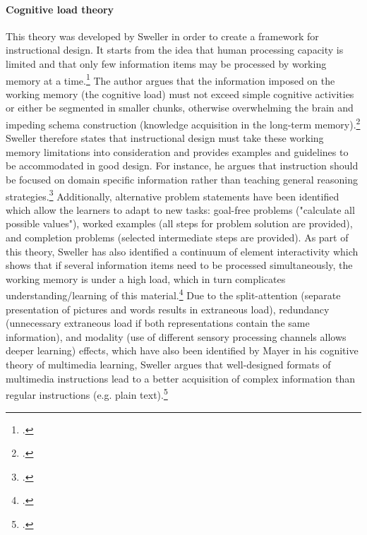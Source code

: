 \paragraph{Cognitive load theory} This theory was developed by Sweller in order to create a framework for instructional design. It starts from the idea that human processing capacity is limited and that only few information items may be processed by working memory at a time.\footcites[Cf.][p.250]{SwellerCognitiveArchitectureInstructional1998}[cf.][p.490]{Gervenefficiencymultimedialearning2003} The author argues that the information imposed on the working memory (the cognitive load) must not exceed simple cognitive activities or either be segmented in smaller chunks, otherwise overwhelming the brain and impeding schema construction (knowledge acquisition in the long-term memory).\footcites[Cf.][pp.255 et seq]{SwellerCognitiveArchitectureInstructional1998}[cf.][p.2]{SwellerVisualisationInstructionalDesign2002}[cf.][p.562]{Gervenefficiencymultimedialearning2003} Sweller therefore states that instructional design must take these working memory limitations into consideration and provides examples and guidelines to be accommodated in good design. For instance, he argues that instruction should be focused on domain specific information rather than teaching general reasoning strategies.\footcites[Cf.][p.255]{SwellerCognitiveArchitectureInstructional1998}[cf.][p.301]{SwellerCognitiveloadtheory1994} Additionally, alternative problem statements have been identified which allow the learners to adapt to new tasks: goal-free problems ("calculate all possible values"), worked examples (all steps for problem solution are provided), and completion problems (selected intermediate steps are provided).
As part of this theory, Sweller has also identified a continuum of element interactivity which shows that if several information items need to be processed simultaneously, the working memory is under a high load, which in turn complicates understanding/learning of this material.\footcites[Cf.][p.261]{SwellerCognitiveArchitectureInstructional1998} Due to the split-attention (separate presentation of pictures and words results in extraneous load), redundancy (unnecessary extraneous load if both representations contain the same information), and modality (use of different sensory processing channels allows deeper learning) effects, which have also been identified by Mayer in his cognitive theory of multimedia learning, Sweller argues that well-designed formats of multimedia instructions lead to a better acquisition of complex information than regular instructions (e.g. plain text).\footcites[Cf.][p.4]{PaasCognitiveLoadTheory2004}

